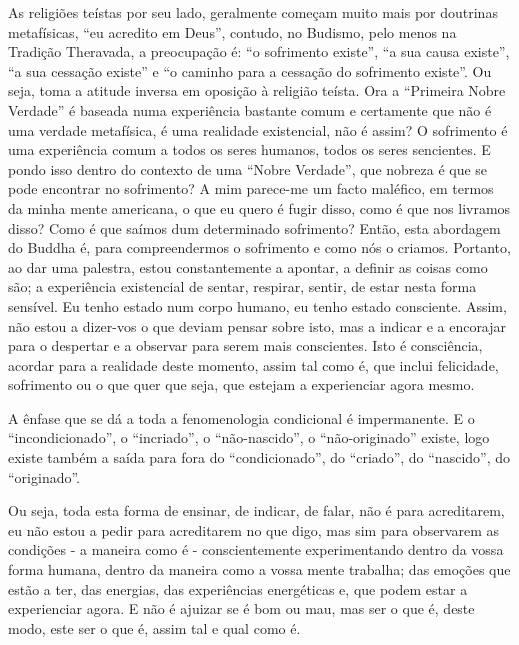 As religiões teístas por seu lado, geralmente começam muito mais por
doutrinas metafísicas, ``eu acredito em Deus'', contudo, no Budismo,
pelo menos na Tradição Theravada, a preocupação é: ``o sofrimento
existe'', ``a sua causa existe'', ``a sua cessação existe'' e ``o
caminho para a cessação do sofrimento existe''. Ou seja, toma a atitude
inversa em oposição à religião teísta. Ora a ``Primeira Nobre Verdade''
é baseada numa experiência bastante comum e certamente que não é uma
verdade metafísica, é uma realidade existencial, não é assim? O
sofrimento é uma experiência comum a todos os seres humanos, todos os
seres sencientes. E pondo isso dentro do contexto de uma ``Nobre
Verdade'', que nobreza é que se pode encontrar no sofrimento? A mim
parece-me um facto maléfico, em termos da minha mente americana, o que
eu quero é fugir disso, como é que nos livramos disso? Como é que saímos
dum determinado sofrimento? Então, esta abordagem do Buddha é, para
compreendermos o sofrimento e como nós o criamos. Portanto, ao dar uma
palestra, estou constantemente a apontar, a definir as coisas como são;
a experiência existencial de sentar, respirar, sentir, de estar nesta
forma sensível. Eu tenho estado num corpo humano, eu tenho estado
consciente. Assim, não estou a dizer-vos o que deviam pensar sobre isto,
mas a indicar e a encorajar para o despertar e a observar para serem
mais conscientes. Isto é consciência, acordar para a realidade deste
momento, assim tal como é, que inclui felicidade, sofrimento ou o que
quer que seja, que estejam a experienciar agora mesmo.

A ênfase que se dá a toda a fenomenologia condicional é impermanente. E
o ``incondicionado'', o ``incriado'', o ``não-nascido'', o
``não-originado'' existe, logo existe também a saída para fora do
``condicionado'', do ``criado'', do ``nascido'', do ``originado''.

Ou seja, toda esta forma de ensinar, de indicar, de falar, não é para
acreditarem, eu não estou a pedir para acreditarem no que digo, mas sim
para observarem as condições - a maneira como é - conscientemente
experimentando dentro da vossa forma humana, dentro da maneira como a
vossa mente trabalha; das emoções que estão a ter, das energias, das
experiências energéticas e, que podem estar a experienciar agora. E não
é ajuizar se é bom ou mau, mas ser o que é, deste modo, este ser o que
é, assim tal e qual como é.

